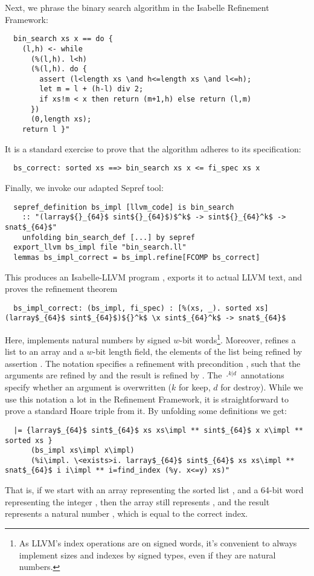 \documentclass[a4paper,USenglish,cleveref, autoref]{lipics-v2019}
\begin{document}
Next, we phrase the binary search algorithm in the Isabelle Refinement Framework:
\begin{lstlisting}
  bin_search xs x == do {
    (l,h) <- while
      (%(l,h). l<h) 
      (%(l,h). do {
        assert (l<length xs \and h<=length xs \and l<=h);
        let m = l + (h-l) div 2;
        if xs!m < x then return (m+1,h) else return (l,m)
      }) 
      (0,length xs);
    return l }"
\end{lstlisting}
It is a standard exercise to prove that the algorithm adheres to its specification:
\begin{lstlisting}
  bs_correct: sorted xs ==> bin_search xs x <= fi_spec xs x
\end{lstlisting}
Finally, we invoke our adapted Sepref tool: 
\begin{lstlisting}
  sepref_definition bs_impl [llvm_code] is bin_search
    :: "(larray${}_{64}$ sint${}_{64}$)$^k$ -> sint${}_{64}^k$ -> snat$_{64}$"
    unfolding bin_search_def [...] by sepref
  export_llvm bs_impl file "bin_search.ll"
  lemmas bs_impl_correct = bs_impl.refine[FCOMP bs_correct]
\end{lstlisting}
This produces an Isabelle-LLVM program , exports it to actual LLVM text, and proves the refinement theorem
\begin{lstlisting}
  bs_impl_correct: (bs_impl, fi_spec) : [%(xs, _). sorted xs] (larray$_{64}$ sint$_{64}$)${}^k$ \x sint$_{64}^k$ -> snat$_{64}$
\end{lstlisting}
Here,  implements natural numbers by signed $w$-bit words\footnote{As LLVM's index operations are on signed words, 
  it's convenient to always implement sizes and indexes by signed types, even if they are natural numbers.}.
Moreover,  refines a list to an array and a $w$-bit length field, the elements of the list being refined by assertion .
The notation  specifies a refinement with precondition \q{\is{\Phi}}, such that the 
arguments are refined by  and the result is refined by . 
The $\cdot^{k|d}$ annotations specify whether an argument is overwritten ($k$ for keep, $d$ for destroy).
While we use this notation a lot in the Refinement Framework, it is straightforward to prove a standard Hoare triple from it. By unfolding some definitions we get:
\begin{lstlisting}
  |= {larray$_{64}$ sint$_{64}$ xs xs\impl ** sint$_{64}$ x x\impl ** sorted xs }
      (bs_impl xs\impl x\impl)
      (%i\impl. \<exists>i. larray$_{64}$ sint$_{64}$ xs xs\impl ** snat$_{64}$ i i\impl ** i=find_index (%y. x<=y) xs)"
\end{lstlisting}
That is, if we start with an array  representing the sorted list , and 
a 64-bit word  representing the integer ,
then the array still represents , and the result  represents a natural number , which is equal to the correct index.
\end{document}
